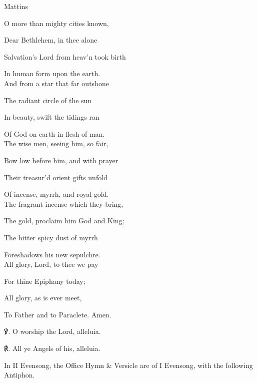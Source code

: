 \begin{paracol}{2}[]
\switchcolumn

\begin{inhead}
	Mattins
\end{inhead}
\begin{hangparas}{1.25em}{1}
O more than mighty cities known,

Dear Bethlehem, in thee alone

Salvation’s Lord from heav'n took birth

In human form upon the earth.\\

And from a star that far outshone

The radiant circle of the sun

In beauty, swift the tidings ran

Of God on earth in flesh of man.\\

The wise men, seeing him, so fair,

Bow low before him, and with prayer

Their treasur'd orient gifts unfold

Of incense, myrrh, and royal gold.\\

The fragrant incense which they bring,

The gold, proclaim him God and King;

The bitter spicy dust of myrrh

Foreshadows his new sepulchre.\\

All glory, Lord, to thee we pay

For thine Epiphany today;

All glory, as is ever meet,

To Father and to Paraclete. Amen.\\
\end{hangparas}

	℣. O worship the Lord, alleluia.

	℟. All ye Angels of his, alleluia.
	
	
	\fussy
\end{paracol}

\begin{rubric}
	In II Evensong, the Office Hymn \& Versicle are of I Evensong, with the following Antiphon.
\end{rubric}

